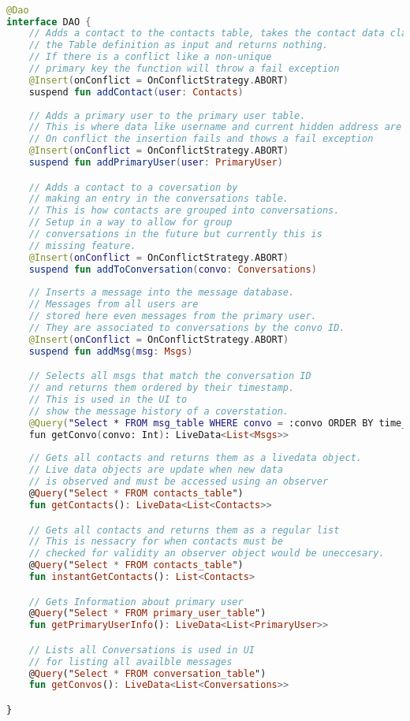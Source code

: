 \documentclass[../main/main.tex]{subfiles}
\begin{document}
\begin{lstlisting}[caption={Example of DAO definition.}, label={lst:example2}, language=Kotlin]

@Dao
interface DAO {
    // Adds a contact to the contacts table, takes the contact data class from
    // the Table definition as input and returns nothing.
    // If there is a conflict like a non-unique 
    // primary key the function will throw a fail exception
    @Insert(onConflict = OnConflictStrategy.ABORT)
    suspend fun addContact(user: Contacts)
    
    // Adds a primary user to the primary user table.
    // This is where data like username and current hidden address are stored.
    // On conflict the insertion fails and thows a fail exception
    @Insert(onConflict = OnConflictStrategy.ABORT)
    suspend fun addPrimaryUser(user: PrimaryUser)

    // Adds a contact to a coversation by 
    // making an entry in the conversations table.
    // This is how contacts are grouped into conversations.
    // Setup in a way to allow for group 
    // conversations in the future but currently this is 
    // missing feature.
    @Insert(onConflict = OnConflictStrategy.ABORT)
    suspend fun addToConversation(convo: Conversations)
    
    // Inserts a message into the message database.
    // Messages from all users are 
    // stored here even messages from the primary user.
    // They are associated to conversations by the convo ID.
    @Insert(onConflict = OnConflictStrategy.ABORT)
    suspend fun addMsg(msg: Msgs)

    // Selects all msgs that match the conversation ID
    // and returns them ordered by their timestamp.
    // This is used in the UI to 
    // show the message history of a coverstation.
    @Query("Select * FROM msg_table WHERE convo = :convo ORDER BY time_stamp ASC")
    fun getConvo(convo: Int): LiveData<List<Msgs>>
    
    // Gets all contacts and returns them as a livedata object.
    // Live data objects are update when new data 
    // is observed and must be accessed using an observer
    @Query("Select * FROM contacts_table")
    fun getContacts(): LiveData<List<Contacts>>

    // Gets all contacts and returns them as a regular list
    // This is nessacry for when contacts must be 
    // checked for validity an observer object would be uneccesary.
    @Query("Select * FROM contacts_table")
    fun instantGetContacts(): List<Contacts>

    // Gets Information about primary user
    @Query("Select * FROM primary_user_table")
    fun getPrimaryUserInfo(): LiveData<List<PrimaryUser>>

    // Lists all Conversations is used in UI 
    // for listing all availble messages
    @Query("Select * FROM conversation_table")
    fun getConvos(): LiveData<List<Conversations>>

}
\end{lstlisting}
\end{document}
